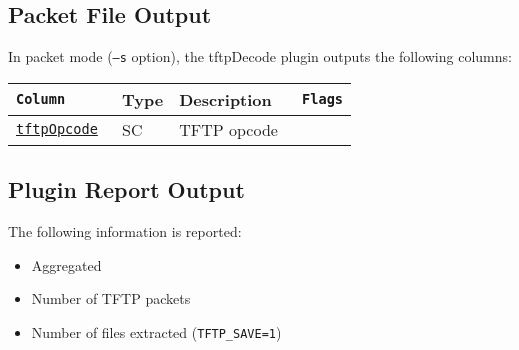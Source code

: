 \documentclass[documentation]{subfiles}
\begin{document}
\clearpage

\subsection{Packet File Output}
In packet mode ({\tt --s} option), the tftpDecode plugin outputs the following columns:
\begin{longtable}{>{\tt}lll>{\tt\small}l}
    \toprule
    {\bf Column} & {\bf Type} & {\bf Description} & {\bf Flags}\\
    \midrule\endhead%
    \hyperref[tftpOpCBF]{tftpOpcode} & SC & TFTP opcode & \\
    \bottomrule
\end{longtable}

\subsection{Plugin Report Output}
The following information is reported:
\begin{itemize}
    \item Aggregated {\tt{}}
    \item Number of TFTP packets
    \item Number of files extracted ({\tt TFTP\_SAVE=1})
\end{itemize}
\end{document}
